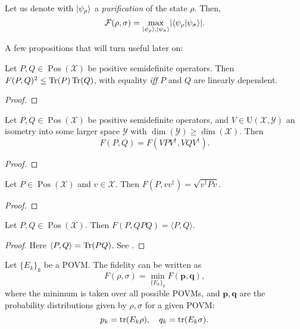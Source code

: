 \documentclass[a4paper]{report}
\newcommand{\bs}[1]{\boldsymbol{#1}}
\newcommand{\calF}{{\mathcal{F}}}
\newcommand{\calY}{{\mathcal{Y}}}
\newcommand{\calX}{{\mathcal{X}}}
\newcommand{\rmU}{{\mathrm{U}}}
\DeclareMathOperator{\Pos}{Pos}
\begin{document}
\begin{thm}
	Let us denote with $\ket{\psi_\rho}$ a \emph{purification} of the state $\rho$. Then,
	\begin{equation}
		\calF(\rho,\sigma)=\max_{\ket{\psi_\rho},\ket{\psi_\sigma}}\lvert\braket{\psi_\rho}{\psi_\sigma}\rvert.
	\end{equation}
\end{thm}

A few propositions that will turn useful later on:
\begin{prop}
	Let $P,Q\in\Pos(\calX)$ be positive semidefinite operators.
	Then $F(P,Q)^2 \le \Tr(P)\Tr(Q)$, with equality \emph{iff} $P$ and $Q$ are linearly dependent.
\end{prop}
\begin{proof}
\end{proof}

\begin{prop}
	Let $P,Q\in\Pos(\calX)$ be positive semidefinite operators, and $V\in\rmU(\calX,\calY)$ an isometry into some larger space $\calY$ with $\dim(\calY)\ge\dim(\calX)$. Then
	\begin{equation}
		F(P,Q) = F(VPV^\dagger, VQV^\dagger).
	\end{equation}
\end{prop}
\begin{proof}
\end{proof}

\begin{prop}
	Let $P\in\Pos(\calX)$ and $v\in\calX$. Then
	$F(P,vv^\dagger) = \sqrt{v^\dagger  P v}$.
\end{prop}
\begin{proof}
\end{proof}

\begin{prop}
	Let $P,Q\in\Pos(\calX)$. Then
	$F(P,QPQ) = \langle P,Q\rangle$.
\end{prop}
\begin{proof}
	Here $\langle P,Q\rangle=\Tr(PQ)$. See .
\end{proof}


\begin{prop}
	Let $\{E_k\}_k$ be a POVM. The fidelity can be written as
	\begin{equation}
		F(\rho,\sigma)=\min_{\{E_k\}_k} F(\bs p,\bs q),
	\end{equation}
	where the minimum is taken over all possible POVMs, and $\bs p,\bs q$ are the probability distributions given by $\rho,\sigma$ for a given POVM:
	\begin{equation}
		p_k=\tr(E_k \rho),\quad q_k=\tr(E_k \sigma).
	\end{equation}
\end{prop}
\end{document}
